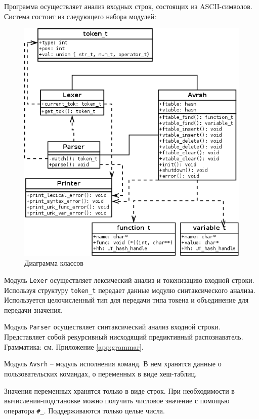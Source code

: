 \documentclass[a4paper, 12pt]{article}
\begin{document}
Программа осуществляет анализ входных строк, состоящих из ASCII-символов.
\clearpage
Система состоит из следующего набора модулей:
\begin{figure}[H]
	\centering
	\includegraphics[width=\textwidth]{diag/class.png}
	\caption{Диаграмма классов}
\end{figure}

Модуль {\tt Lexer} осуществляет лексический анализ и токенизацию входной строки. Используя структуру {\tt token\_t} передает данные 
модулю синтаксического анализа. Используется целочисленный тип для передачи типа токена и объединение для передачи значения.

Модуль {\tt Parser} осуществляет синтаксический анализ входной строки.
Представляет собой рекурсивный нисходящий предиктивный распознаватель. Грамматика: см. Приложение \ref{app:grammar}.

Модуль {\tt Avsrh} -- модуль исполнения команд. В нем хранятся 
данные о пользовательских командах, о переменных в виде хеш-таблиц.

Значения переменных хранятся только в виде строк. При необходимости в вычислении-подстановке можно получить числовое значение с помощью оператора {\tt \#\_}. Поддерживаются только целые числа.
\end{document}
